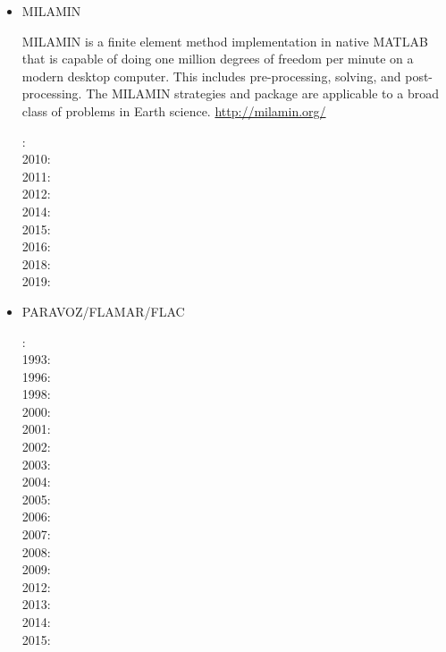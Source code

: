\begin{itemize}
\item MILAMIN

MILAMIN is a finite element method implementation in native MATLAB that is capable of doing one million degrees of freedom per minute on a modern desktop computer. This includes pre-processing, solving, and post-processing. The MILAMIN strategies and package are applicable to a broad class of problems in Earth science. \url{http://milamin.org/}

: \cite{daks08}\\
2010: \cite{krda10}\cite{kaus10}\\
2011: \cite{yakm11}\\
2012: \cite{gebk12}\\
2014: \cite{jobk14}\\
2015: \cite{lukz15}\cite{gehm15}\cite{thkp15}\cite{musd15}\\
2016: \cite{jads16}\cite{maka16}\\
2018: \cite{dusd18}\cite{jasc18}\cite{jadg18}\cite{comj18}\cite{jens18}\cite{rabw18}\cite{chsm18}\\
2019: \cite{anpa19}\cite{sifg19}\cite{baba19}


\item PARAVOZ/FLAMAR/FLAC

: \cite{cund89}\\
1993: \cite{poli93}\\
1996: \cite{hach96}\\
1998: \cite{gepd98}\\
2000: \cite{labp00}\\
2001: \cite{bujl01}\cite{bupo01}\\
2002: \cite{bast02}\cite{clbb02}\\
2003: \cite{hags03}\cite{gehd03}\cite{upke03}\\
2004: \cite{guhl04}\cite{gewi04}\cite{toba04}\cite{tibb04}\\
2005: \cite{bugu05}\\
2006: \cite{buwa06}\\
2007: \cite{yaab07}\cite{buto07}\\
2008: \cite{yaba08}\cite{tibb08}\\
2009: \cite{gecm09}\cite{yahb09}\cite{bucl09}\\
2012: \cite{anwb12}\cite{gech12}\cite{gubc12}\cite{gerb12}\\
2013: \cite{wabd13}\cite{frbm13}\\
2014: \cite{frba14}\cite{gagb14}\cite{bufa14}\\
2015: \cite{wulc15}\cite{marl15}\cite{gebw15}\cite{svlh15}\\





\end{itemize}
